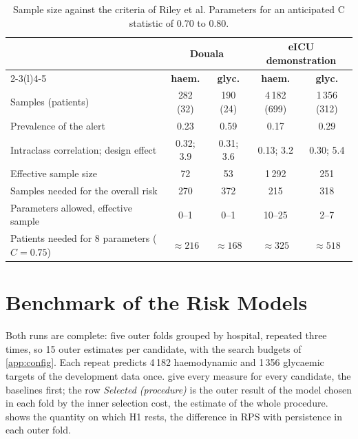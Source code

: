 \documentclass[11pt,a4paper,oneside]{report}
\begin{document}
\begin{table}[htbp]
\centering\footnotesize
\caption{Sample size against the criteria of Riley et al. Parameters for an anticipated C statistic of 0.70 to 0.80.}\label{tab:sample-size}
\begin{tabularx}{\textwidth}{@{}X cccc@{}}
\toprule
 & \multicolumn{2}{c}{\textbf{Douala}} & \multicolumn{2}{c}{\textbf{eICU demonstration}} \\
\cmidrule(lr){2-3}\cmidrule(l){4-5}
 & \textbf{haem.} & \textbf{glyc.} & \textbf{haem.} & \textbf{glyc.} \\
\midrule
Samples (patients) & 282 (32) & 190 (24) & 4\,182 (699) & 1\,356 (312) \\
Prevalence of the alert & 0.23 & 0.59 & 0.17 & 0.29 \\
Intraclass correlation; design effect & 0.32; 3.9 & 0.31; 3.6 & 0.13; 3.2 & 0.30; 5.4 \\
Effective sample size & 72 & 53 & 1\,292 & 251 \\
Samples needed for the overall risk & 270 & 372 & 215 & 318 \\
Parameters allowed, effective sample & 0--1 & 0--1 & 10--25 & 2--7 \\
Patients needed for 8 parameters ($C = 0.75$) & $\approx 216$ & $\approx 168$ & $\approx 325$ & $\approx 518$ \\
\bottomrule
\end{tabularx}
\end{table}

\section{Benchmark of the Risk Models}\label{sec:results-benchmark}

Both runs are complete: five outer folds grouped by hospital, repeated three times, so 15 outer estimates per candidate, with the search budgets of \cref{app:config}. Each repeat predicts 4\,182 haemodynamic and 1\,356 glycaemic targets of the development data once.  give every measure for every candidate, the baselines first; the row \emph{Selected (procedure)} is the outer result of the model chosen in each fold by the inner selection cost, the estimate of the whole procedure.  shows the quantity on which H1 rests, the difference in RPS with persistence in each outer fold.
\end{document}
